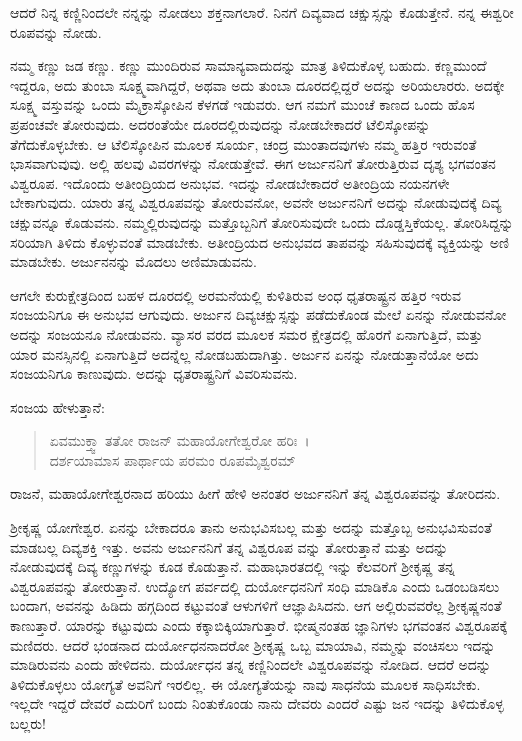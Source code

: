 {\small ಆದರೆ ನಿನ್ನ ಕಣ್ಣಿನಿಂದಲೇ ನನ್ನನ್ನು ನೋಡಲು ಶಕ್ತನಾಗಲಾರೆ. ನಿನಗೆ ದಿವ್ಯವಾದ ಚಕ್ಷುಸ್ಸನ್ನು ಕೊಡುತ್ತೇನೆ. ನನ್ನ ಈಶ್ವರೀ ರೂಪವನ್ನು ನೋಡು.}

ನಮ್ಮ ಕಣ್ಣು ಜಡ ಕಣ್ಣು. ಕಣ್ಣು ಮುಂದಿರುವ ಸಾಮಾನ್ಯವಾದುದನ್ನು ಮಾತ್ರ ತಿಳಿದುಕೊಳ್ಳ ಬಹುದು. ಕಣ್ಣಮುಂದೆ ಇದ್ದರೂ, ಅದು ತುಂಬಾ ಸೂಕ್ಷ್ಮವಾಗಿದ್ದರೆ, ಅಥವಾ ಅದು ತುಂಬಾ ದೂರದಲ್ಲಿದ್ದರೆ ಅದನ್ನು ಅರಿಯಲಾರರು. ಅದಕ್ಕೇ ಸೂಕ್ಷ್ಮ ವಸ್ತುವನ್ನು ಒಂದು ಮೈಕ್ರಾಸ್ಕೋಪಿನ ಕೆಳಗಡೆ ಇಡುವರು. ಆಗ ನಮಗೆ ಮುಂಚೆ ಕಾಣದ ಒಂದು ಹೊಸ ಪ್ರಪಂಚವೇ ತೋರುವುದು. ಅದರಂತೆಯೇ ದೂರದಲ್ಲಿರುವುದನ್ನು ನೋಡಬೇಕಾದರೆ ಟೆಲಿಸ್ಕೋಪನ್ನು ತೆಗೆದುಕೊಳ್ಳಬೇಕು. ಆ ಟೆಲಿಸ್ಕೋಪಿನ ಮೂಲಕ ಸೂರ್ಯ, ಚಂದ್ರ ಮುಂತಾದವುಗಳು ನಮ್ಮ ಹತ್ತಿರ ಇರುವಂತೆ ಭಾಸವಾಗುವುವು. ಅಲ್ಲಿ ಹಲವು ವಿವರಗಳನ್ನು ನೋಡುತ್ತೇವೆ. ಈಗ ಅರ್ಜುನನಿಗೆ ತೋರುತ್ತಿರುವ ದೃಶ್ಯ ಭಗವಂತನ ವಿಶ್ವರೂಪ. ಇದೊಂದು ಅತೀಂದ್ರಿಯದ ಅನುಭವ. ಇದನ್ನು ನೋಡಬೇಕಾದರೆ ಅತೀಂದ್ರಿಯ ನಯನಗಳೇ ಬೇಕಾಗುವುದು. ಯಾರು ತನ್ನ ವಿಶ್ವರೂಪವನ್ನು ತೋರುವನೋ, ಅವನೇ ಅರ್ಜುನನಿಗೆ ಅದನ್ನು ನೋಡುವುದಕ್ಕೆ ದಿವ್ಯ ಚಕ್ಷುವನ್ನೂ ಕೊಡುವನು. ನಮ್ಮಲ್ಲಿರುವುದನ್ನು ಮತ್ತೊಬ್ಬನಿಗೆ ತೋರಿಸುವುದೇ ಒಂದು ದೊಡ್ಡಸ್ತಿಕೆಯಲ್ಲ. ತೋರಿಸಿದ್ದನ್ನು ಸರಿಯಾಗಿ ತಿಳಿದು ಕೊಳ್ಳುವಂತೆ ಮಾಡಬೇಕು. ಅತೀಂದ್ರಿಯದ ಅನುಭವದ ತಾಪವನ್ನು ಸಹಿಸುವುದಕ್ಕೆ ವ್ಯಕ್ತಿಯನ್ನು ಅಣಿ ಮಾಡಬೇಕು. ಅರ್ಜುನನನ್ನು ಮೊದಲು ಅಣಿಮಾಡುವನು.

ಆಗಲೇ ಕುರುಕ್ಷೇತ್ರದಿಂದ ಬಹಳ ದೂರದಲ್ಲಿ ಅರಮನೆಯಲ್ಲಿ ಕುಳಿತಿರುವ ಅಂಧ ಧೃತರಾಷ್ಟ್ರನ ಹತ್ತಿರ ಇರುವ ಸಂಜಯನಿಗೂ ಈ ಅನುಭವ ಆಗುವುದು. ಅರ್ಜುನ ದಿವ್ಯಚಕ್ಷುಸ್ಸನ್ನು ಪಡೆದುಕೊಂಡ ಮೇಲೆ ಏನನ್ನು ನೋಡುವನೋ ಅದನ್ನು ಸಂಜಯನೂ ನೋಡುವನು. ವ್ಯಾಸರ ವರದ ಮೂಲಕ ಸಮರ ಕ್ಷೇತ್ರದಲ್ಲಿ ಹೊರಗೆ ಏನಾಗುತ್ತಿದೆ, ಮತ್ತು ಯಾರ ಮನಸ್ಸಿನಲ್ಲಿ ಏನಾಗುತ್ತಿದೆ ಅದನ್ನೆಲ್ಲ ನೋಡಬಹುದಾಗಿತ್ತು. ಅರ್ಜುನ ಏನನ್ನು ನೋಡುತ್ತಾನೆಯೋ ಅದು ಸಂಜಯನಿಗೂ ಕಾಣುವುದು. ಅದನ್ನು ಧೃತರಾಷ್ಟ್ರನಿಗೆ ವಿವರಿಸುವನು.

ಸಂಜಯ ಹೇಳುತ್ತಾನೆ:

\begin{verse}
ಏವಮುಕ್ತ್ವಾ ತತೋ ರಾಜನ್ ಮಹಾಯೋಗೇಶ್ವರೋ ಹರಿಃ~।\\ದರ್ಶಯಾಮಾಸ ಪಾರ್ಥಾಯ ಪರಮಂ ರೂಪಮೈಶ್ವರಮ್ 
\end{verse}

{\small ರಾಜನೆ, ಮಹಾಯೋಗೇಶ್ವರನಾದ ಹರಿಯು ಹೀಗೆ ಹೇಳಿ ಅನಂತರ ಅರ್ಜುನನಿಗೆ ತನ್ನ ವಿಶ್ವರೂಪವನ್ನು ತೋರಿದನು.}

ಶ‍್ರೀಕೃಷ್ಣ ಯೋಗೇಶ್ವರ. ಏನನ್ನು ಬೇಕಾದರೂ ತಾನು ಅನುಭವಿಸಬಲ್ಲ ಮತ್ತು ಅದನ್ನು ಮತ್ತೊಬ್ಬ ಅನುಭವಿಸುವಂತೆ ಮಾಡಬಲ್ಲ ದಿವ್ಯಶಕ್ತಿ ಇತ್ತು. ಅವನು ಅರ್ಜುನನಿಗೆ ತನ್ನ ವಿಶ್ವರೂಪ ವನ್ನು ತೋರುತ್ತಾನೆ ಮತ್ತು ಅದನ್ನು ನೋಡುವುದಕ್ಕೆ ದಿವ್ಯ ಕಣ್ಣುಗಳನ್ನು ಕೂಡ ಕೊಡುತ್ತಾನೆ. ಮಹಾಭಾರತದಲ್ಲಿ ಇನ್ನು ಕೆಲವರಿಗೆ ಶ‍್ರೀಕೃಷ್ಣ ತನ್ನ ವಿಶ್ವರೂಪವನ್ನು ತೋರುತ್ತಾನೆ. ಉದ್ಯೋಗ ಪರ್ವದಲ್ಲಿ ದುರ್ಯೋಧನನಿಗೆ ಸಂಧಿ ಮಾಡಿಕೊ ಎಂದು ಒಡಂಬಡಿಸಲು ಬಂದಾಗ, ಅವನನ್ನು ಹಿಡಿದು ಹಗ್ಗದಿಂದ ಕಟ್ಟುವಂತೆ ಆಳುಗಳಿಗೆ ಆಜ್ಞಾಪಿಸಿದನು. ಆಗ ಅಲ್ಲಿರುವವರೆಲ್ಲ ಶ‍್ರೀಕೃಷ್ಣನಂತೆ ಕಾಣುತ್ತಾರೆ. ಯಾರನ್ನು ಕಟ್ಟುವುದು ಎಂದು ಕಕ್ಕಾಬಿಕ್ಕಿಯಾಗುತ್ತಾರೆ. ಭೀಷ್ಮನಂತಹ ಜ್ಞಾನಿಗಳು ಭಗವಂತನ ವಿಶ್ವರೂಪಕ್ಕೆ ಮಣಿದರು. ಆದರೆ ಭಂಡನಾದ ದುರ್ಯೋಧನನಾದರೋ ಶ‍್ರೀಕೃಷ್ಣ ಒಬ್ಬ ಮಾಯಾವಿ, ನಮ್ಮನ್ನು ವಂಚಿಸಲು ಇದನ್ನು ಮಾಡಿರುವನು ಎಂದು ಹೇಳಿದನು. ದುರ್ಯೋಧನ ತನ್ನ ಕಣ್ಣಿನಿಂದಲೇ ವಿಶ್ವರೂಪವನ್ನು ನೋಡಿದ. ಆದರೆ ಅದನ್ನು ತಿಳಿದುಕೊಳ್ಳಲು ಯೋಗ್ಯತೆ ಅವನಿಗೆ ಇರಲಿಲ್ಲ. ಈ ಯೋಗ್ಯತೆಯನ್ನು ನಾವು ಸಾಧನೆಯ ಮೂಲಕ ಸಾಧಿಸಬೇಕು. ಇಲ್ಲದೇ ಇದ್ದರೆ ದೇವರೆ ಎದುರಿಗೆ ಬಂದು ನಿಂತುಕೊಂಡು ನಾನು ದೇವರು ಎಂದರೆ ಎಷ್ಟು ಜನ ಇದನ್ನು ತಿಳಿದುಕೊಳ್ಳ ಬಲ್ಲರು!

